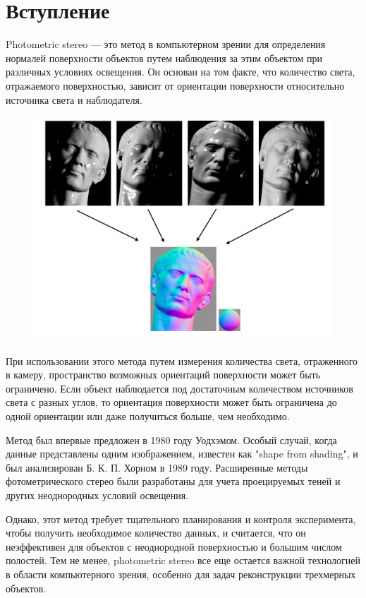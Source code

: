 \documentclass[12pt]{article}
\begin{document}


\newpage
\tableofcontents

\newpage

\section{Вступление}

Photometric stereo — это метод в компьютерном зрении для определения
нормалей поверхности объектов путем наблюдения за этим объектом
при различных условиях освещения. Он основан на том факте,
что количество света, отражаемого поверхностью, зависит от ориентации
поверхности относительно источника света и наблюдателя.

\begin{figure}[h]
  \centering
  \includegraphics[scale=0.3]{tex/example.png}
\end{figure}

При использовании этого метода путем измерения количества света,
отраженного в камеру, пространство возможных ориентаций поверхности может
быть ограничено. Если объект наблюдается под достаточным количеством источников
света с разных углов, то ориентация поверхности может быть ограничена
до одной ориентации или даже получиться больше, чем необходимо.

Метод был впервые предложен в 1980 году Уодхэмом. Особый случай,
когда данные представлены одним изображением, известен как "shape from shading",
и был анализирован Б. К. П. Хорном в 1989 году. Расширенные методы фотометрического
стерео были разработаны для учета проецируемых теней и других
неоднородных условий освещения.

Однако, этот метод требует тщательного планирования и контроля эксперимента,
чтобы получить необходимое количество данных, и считается,
что он неэффективен для объектов с неоднородной поверхностью
и большим числом полостей. Тем не менее, photometric stereo все еще остается
важной технологией в области компьютерного зрения, особенно для задач
реконструкции трехмерных объектов.
\end{document}
